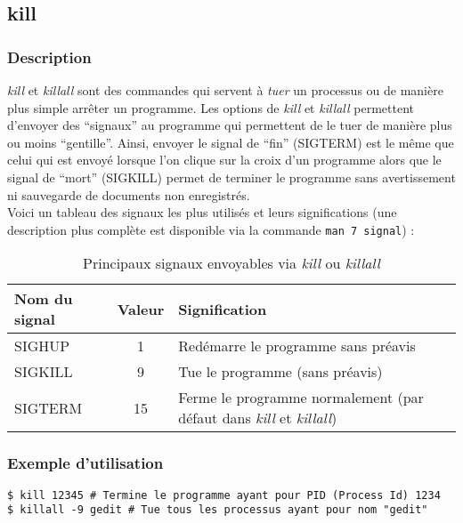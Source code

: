 \subsection*{kill}
\subsubsection*{Description}
\emph{kill} et \emph{killall} sont des commandes qui servent à \textit{tuer} un
processus ou de manière plus simple arrêter un programme. Les options de
\emph{kill} et \emph{killall} permettent d'envoyer des ``signaux'' au programme
qui permettent de le tuer de manière plus ou moins ``gentille''. Ainsi, envoyer
le signal de ``fin'' (SIGTERM) est le même que celui qui est envoyé lorsque l'on
clique sur la croix d'un programme alors que le signal de ``mort'' (SIGKILL)
permet de terminer le programme sans avertissement ni sauvegarde de documents
non enregistrés.\\
Voici un tableau des signaux les plus utilisés et leurs significations
(une description plus complète est disponible via la commande
\lstinline|man 7 signal|) :

\begin{table}[h]
	\centering
	\begin{tabular}{|l|c|l|}
		\hline
		\textbf{Nom du signal} & \textbf{Valeur} & \textbf{Signification} \\
		\hline
		SIGHUP & 1 & Redémarre le programme sans préavis \\
		\hline
		SIGKILL & 9 & Tue le programme (sans préavis) \\
		\hline
		SIGTERM & 15 & Ferme le programme normalement (par défaut dans
		\emph{kill} et \emph{killall}) \\
		\hline
	\end{tabular}
	\caption{Principaux signaux envoyables via \emph{kill} ou \emph{killall}}
	\label{tab:signal}
\end{table}

\subsubsection*{Exemple d'utilisation}

\begin{lstlisting}
$ kill 12345 # Termine le programme ayant pour PID (Process Id) 1234
$ killall -9 gedit # Tue tous les processus ayant pour nom "gedit"
\end{lstlisting}
